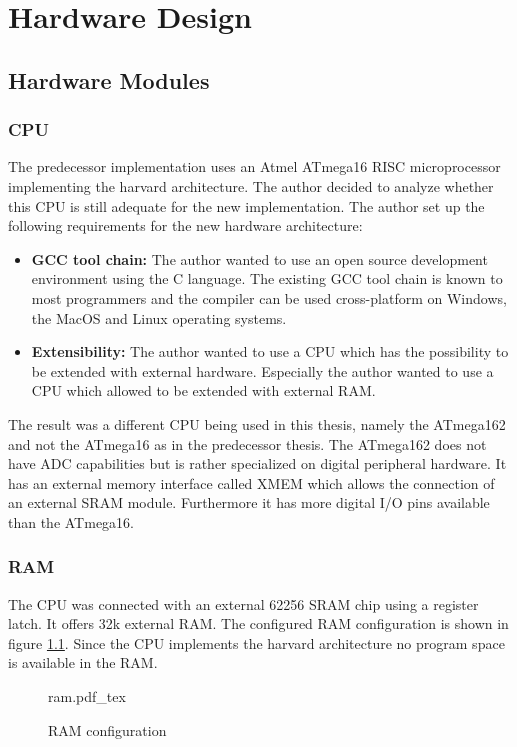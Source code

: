 \chapter{Hardware Design}%
\section{Hardware Modules}%
\subsection{CPU} %
\label{sub:cpu}
The predecessor implementation uses an Atmel ATmega16 RISC microprocessor implementing the harvard architecture. The author decided to analyze whether this CPU is still adequate for the new implementation. The author set up the following requirements for the new hardware architecture:

\begin{itemize}
    \item \textbf{GCC tool chain:} The author wanted to use an open source development environment using the C language. The existing GCC tool chain is known to most programmers and the compiler can be used cross-platform on Windows, the MacOS and Linux operating systems.
    \item \textbf{Extensibility:} The author wanted to use a CPU which has the possibility to be extended with external hardware. Especially the author wanted to use a CPU which allowed to be extended with external RAM.
\end{itemize}

The result was a different CPU being used in this thesis, namely the ATmega162 and not the ATmega16 as in the predecessor thesis. The ATmega162 does not have ADC capabilities but is rather specialized on digital peripheral hardware. It has an external memory interface called XMEM which allows the connection of an external SRAM module. Furthermore it has more digital I/O pins available than the ATmega16.

\subsection{RAM}%
The CPU was connected with an external 62256 SRAM \cite{62256-datasheet} chip using a register latch. It offers 32k external RAM. The configured RAM configuration is shown in figure \ref{fig:ram}. Since the CPU implements the harvard architecture no program space is available in the RAM.

\begin{figure}[H]
\centering
{ram.pdf_tex}
\caption{RAM configuration}
\label{fig:ram}
\end{figure}

